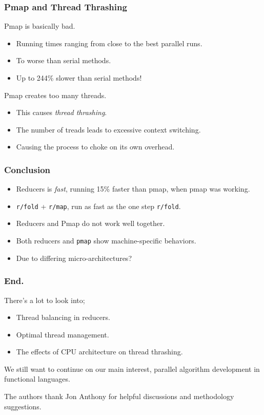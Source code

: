 \documentclass{beamer}
\newcommand{\clocode}[1]{{\texttt {#1}}}
\begin{document}
\begin{frame}
\frametitle{Pmap and Thread Thrashing}
	Pmap is basically bad.
	\begin{itemize}
	\item Running times ranging from close to the best parallel runs.
	\item To worse than serial methods.
	\item Up to 244\% slower than serial methods!
	\end{itemize}
Pmap creates too many threads.
	\begin{itemize}
	\item This causes \emph{thread thrashing}.
	\item The number of treads leads to excessive context switching.
	\item Causing the process to choke on its own overhead.
	\end{itemize}
\end{frame}
\begin{frame}
\frametitle{Conclusion}
	\begin{itemize}
	\item Reducers is \emph{fast}, running 15\% faster than pmap, when pmap was working.
	\item \clocode{r/fold} + \clocode{r/map}, run as fast as the one step \clocode{r/fold}.
	\item Reducers and Pmap do not work well together.
	\item Both reducers and \clocode{pmap} show machine-specific behaviors.
	\item Due to differing micro-architectures?
	\end{itemize}
\end{frame}
\begin{frame}
\frametitle{End.}
	There's a lot to look into;
	\begin{itemize}
	\item Thread balancing in reducers.
	\item Optimal thread management.
	\item The effects of CPU architecture on thread thrashing.
	\end{itemize}
We still want to continue on our main interest, parallel algorithm development in functional languages.
\break

The authors thank Jon Anthony for helpful discussions and methodology suggestions. 
\end{frame}
\end{document}
